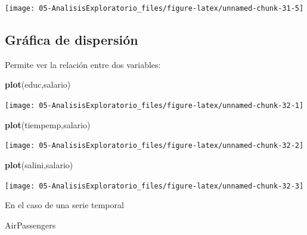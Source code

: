 \documentclass[]{book}
\newenvironment{Shaded}{\begin{snugshade}}{\end{snugshade}}
\newcommand{\KeywordTok}[1]{\textcolor[rgb]{0.13,0.29,0.53}{\textbf{#1}}}
\newcommand{\NormalTok}[1]{#1}
\begin{document}
\begin{center}\texttt{[image: 05-AnalisisExploratorio\_files/figure-latex/unnamed-chunk-31-5]} \end{center}

\hypertarget{grafica-de-dispersion}{%
\subsection{Gráfica de dispersión}\label{grafica-de-dispersion}}

Permite ver la relación entre dos variables:

\begin{Shaded}
\begin{Highlighting}[]
\KeywordTok{plot}\NormalTok{(educ,salario)}
\end{Highlighting}
\end{Shaded}

\begin{center}\texttt{[image: 05-AnalisisExploratorio\_files/figure-latex/unnamed-chunk-32-1]} \end{center}

\begin{Shaded}
\begin{Highlighting}[]
\KeywordTok{plot}\NormalTok{(tiempemp,salario)}
\end{Highlighting}
\end{Shaded}

\begin{center}\texttt{[image: 05-AnalisisExploratorio\_files/figure-latex/unnamed-chunk-32-2]} \end{center}

\begin{Shaded}
\begin{Highlighting}[]
\KeywordTok{plot}\NormalTok{(salini,salario)}
\end{Highlighting}
\end{Shaded}

\begin{center}\texttt{[image: 05-AnalisisExploratorio\_files/figure-latex/unnamed-chunk-32-3]} \end{center}

En el caso de una serie temporal

\begin{Shaded}
\begin{Highlighting}[]
\NormalTok{AirPassengers}
\end{Highlighting}
\end{Shaded}
\end{document}
